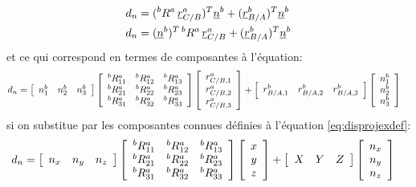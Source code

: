 \begin{align}
d_n &= ( {}^bR^a \, \underline{r}_{C/B}^a )^T \underline{n}^b + ( \underline{r}_{B/A}^b )^T \underline{n}^b \\
d_n &= ( \underline{n}^b )^T \, {}^bR^a \, \underline{r}_{C/B}^a + ( \underline{r}_{B/A}^b )^T \underline{n}^b 
\end{align} 
et ce qui correspond en termes de composantes à l'équation:
\begin{align}
d_n &= \left[ \begin{array}{c c c}
	n_1^b & n_2^b & n_3^b  
\end{array}  \right]
\left[ \begin{array}{c c c}
	{}^bR^a_{11} & {}^bR^a_{12} & {}^bR^a_{13} \\ 
	{}^bR^a_{21} & {}^bR^a_{22} & {}^bR^a_{23} \\
	{}^bR^a_{31} & {}^bR^a_{32} & {}^bR^a_{33}
\end{array}  \right]
 \left[ \begin{array}{c} r_{C/B,1}^a \\ r_{C/B,2}^a \\ r_{C/B,3}^a  \end{array} \right]
+
\left[ \begin{array}{c c c}
	r_{B/A,1}^b & r_{B/A,2}^b & r_{B/A,3}^b  
\end{array}  \right]
 \left[ \begin{array}{c} n_1^b \\ n_2^b \\ n_3^b  \end{array} \right]
\end{align} 
si on substitue par les composantes connues définies à l'équation \eqref{eq:disprojexdef}:
\begin{align}
d_n &=
\left[ \begin{array}{c c c}
	n_x & n_y & n_z  
\end{array}  \right]
\left[ \begin{array}{c c c}
	{}^bR^a_{11} & {}^bR^a_{12} & {}^bR^a_{13} \\ 
	{}^bR^a_{21} & {}^bR^a_{22} & {}^bR^a_{23} \\
	{}^bR^a_{31} & {}^bR^a_{32} & {}^bR^a_{33}
\end{array}  \right]
 \left[ \begin{array}{c} x \\ y \\ z  \end{array} \right]
+
\left[ \begin{array}{c c c}
	X & Y & Z  
\end{array}  \right]
 \left[ \begin{array}{c} n_x \\ n_y \\ n_z  \end{array} \right]
\end{align} 
